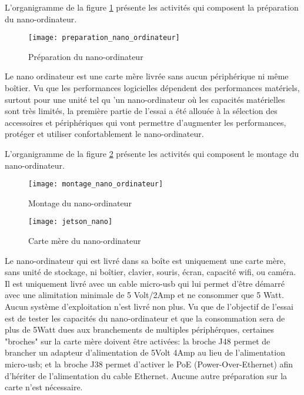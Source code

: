 ﻿\label{preparation_nano_ordinateur}
\par L'organigramme de la figure \ref{fig:preparation_nano_ordinateur} présente les activités qui composent la préparation du nano-ordinateur. 
\begin{figure}[H]
    \centering
    \texttt{[image: preparation\_nano\_ordinateur]}
    \caption{Préparation du nano-ordinateur}
    \label{fig:preparation_nano_ordinateur}
\end{figure}
\par Le nano ordinateur est une carte mère livrée sans aucun périphérique ni même boîtier. Vu que les performances logicielles dépendent des performances matériels, surtout pour une unité tel qu 'un nano-ordinateur où les capacités matérielles sont très limités, la première partie de l'essai a été allouée à la sélection des accessoires et périphériques qui vont permettre d'augmenter les performances, protéger et utiliser confortablement le nano-ordinateur. 
\label{montage_nano_ordinateur}
\par L'organigramme de la figure \ref{fig:montage_nano_ordinateur} présente les activités qui composent le montage du nano-ordinateur. 
\begin{figure}[H]
    \centering
    \texttt{[image: montage\_nano\_ordinateur]}
    \caption{Montage du nano-ordinateur}
    \label{fig:montage_nano_ordinateur}
\end{figure}
\begin{figure}[H]
    \centering
    \texttt{[image: jetson\_nano]}
    \caption{Carte mère du nano-ordinateur}
    \label{fig:jetson_nano}
\end{figure}
\par Le nano-ordinateur qui est livré dans sa boîte est uniquement une carte mère, sans unité de stockage, ni boîtier, clavier, souris, écran, capacité wifi, ou caméra. Il est uniquement livré avec un cable micro-usb qui lui permet d'être démarré avec une alimitation minimale de 5 Volt/2Amp et ne consommer que 5 Watt. Aucun système d'exploitation n'est livré non plus. Vu que de l'objectif de l'essai est de tester les capacités du nano-ordinateur et que la consommation sera de plus de 5Watt dues aux branchements de multiples périphérques, certaines "broches" sur la carte mère doivent être activées:  la broche J48 permet de brancher un adapteur d'alimentation de 5Volt 4Amp au lieu de l'alimentation micro-usb; et la broche J38 permet d'activer le PoE (Power-Over-Ethernet) afin d'hériter de l'alimentation du cable Ethernet. Aucune autre préparation sur la carte n'est nécessaire.
